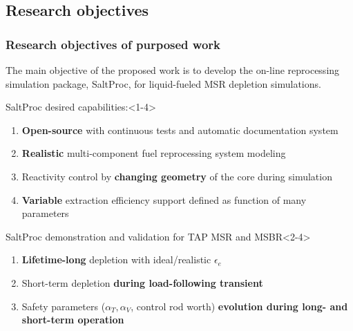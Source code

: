 \subsection{Research objectives}

\begin{frame}
  \frametitle{Research objectives of purposed work}
                  \vspace*{-0.05in}
      The main objective of the proposed work is to develop the on-line  reprocessing simulation package, SaltProc, for liquid-fueled MSR depletion simulations.
     \begin{block}{SaltProc desired capabilities:}<1-4>
         \begin{enumerate}
                \item \textbf{Open-source} with continuous tests and 
				automatic documentation system 
                \item \textbf{Realistic} multi-component fuel 
                reprocessing system modeling
                \item Reactivity control by \textbf{changing geometry} of 
                the core during simulation
                \item \textbf{Variable} extraction efficiency support defined 
                as function of many parameters
         \end{enumerate}
      \end{block}
            \vspace{-0.1in}
	\begin{block}{SaltProc demonstration and validation for TAP MSR and 
	MSBR}<2-4>
		\begin{enumerate}
			\item<2-4> \textbf{Lifetime-long} depletion with ideal/realistic 
			$\epsilon_e$
			\item<3-4> Short-term depletion \textbf{during load-following 
			transient}
			\item<4> Safety parameters ($\alpha_{T}, \alpha_{V}$, control rod 
			worth) \textbf{evolution during long- and short-term operation}
		\end{enumerate}
	\end{block}
\end{frame}

